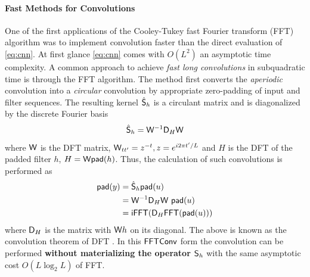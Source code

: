 \paragraph{Fast Methods for Convolutions}
%
One of the first applications of the Cooley-Tukey fast Fourier transform (FFT) algorithm was to implement convolution faster than the direct evaluation of \eqref{eq:cnn}.
At first glance \eqref{eq:cnn} comes with $O(L^2)$ an asymptotic time complexity. 
A common approach to achieve \textit{fast long convolutions} in subquadratic time is through the FFT algorithm. The method first converts the \textit{aperiodic} convolution into a \textit{circular} convolution \cite{selesnick2017fast} by appropriate zero-padding of input and filter sequences. The resulting kernel $\hat{\mathsf{S}}_h$ is a circulant matrix and is diagonalized by the discrete Fourier basis
%
\[
    \hat {\mathsf{S}}_h = \mathsf{W}^{-1} \mathsf{D}_{H} \mathsf{W}
\]
%
where $\mathsf{W}$ is the DFT matrix, $\mathsf{W}_{tt'} = z^{-t}, z = e^{i2\pi t'/L}$ and $H$ is the DFT of the padded filter $h$, $H = \mathsf{W} {\sf pad}(h)$. Thus, the calculation of such convolutions is performed as
%
\begin{equation*}
    \begin{aligned}
        {\sf pad}(y) &= \hat {\mathsf{S}}_h {\sf pad}(u) \\
        &= \mathsf{W}^{-1}\mathsf{D}_H \mathsf{W} ~{\sf pad}(u)\\
        &= {\sf iFFT}(\mathsf{D}_H {\sf FFT}({\sf pad}(u)))
    \end{aligned}
\end{equation*}
%
where $\mathsf{D}_H$ is the matrix with $\mathsf{W} h$ on its diagonal. The above is known as the convolution theorem of DFT \citep{oppenheim1997signals}. In this ${\sf FFTConv}$ form the convolution can be performed \textbf{without materializing the operator $\mathsf{S}_h$} with the same asymptotic cost $O(L\log_2 L)$ of FFT.
%
